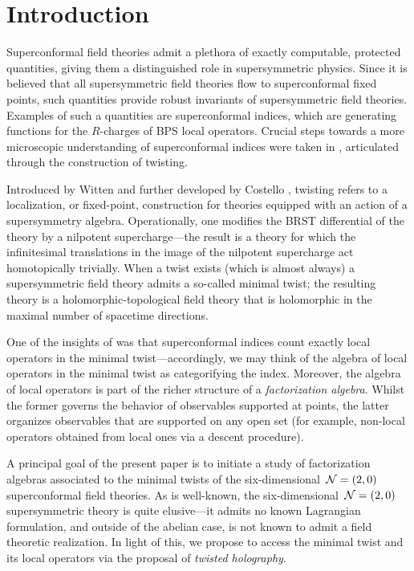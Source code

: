 %
%
%

\section{Introduction}
Superconformal field theories admit a plethora of exactly computable, protected quantities, giving them a distinguished role in supersymmetric physics. 
Since it is believed that all supersymmetric field theories flow to superconformal fixed points, such quantities provide robust invariants of supersymmetric field theories. 
Examples of such a quantities are superconformal indices, which are generating functions for the $R$-charges of BPS local operators. 
Crucial steps towards a more microscopic understanding of superconformal indices were taken in \cite{}, articulated through the construction of twisting.

Introduced by Witten \cite{WittenTwist} and further developed by Costello \cite{CostelloHol}, twisting refers to a localization, or fixed-point, construction for theories equipped with an action of a supersymmetry algebra. 
Operationally, one modifies the BRST differential of the theory by a nilpotent supercharge---the result is a theory for which the infinitesimal translations in the image of the nilpotent supercharge act homotopically trivially. 
When a twist exists (which is almost always) a supersymmetric field theory admits a so-called minimal twist; the resulting theory is a holomorphic-topological field theory that is holomorphic in the maximal number of spacetime directions.

One of the insights of \cite{} was that superconformal indices count exactly local operators in the minimal twist---accordingly, we may think of the algebra of local operators in the minimal twist as categorifying the index. 
Moreover, the algebra of local operators is part of the richer structure of a \textit{factorization algebra}. 
Whilst the former governs the behavior of observables supported at points, the latter organizes observables that are supported on any open set (for example, non-local operators obtained from local ones via a descent procedure). 

A principal goal of the present paper is to initiate a study of factorization algebras associated to the minimal twists of the six-dimensional~$\mathcal N=(2,0)$ superconformal field theories.
As is well-known, the six-dimensional~$\mathcal N=(2,0)$ supersymmetric theory is quite elusive---it admits no known Lagrangian formulation, and outside of the abelian case, is not known to admit a field theoretic realization. 
In light of this, we propose to access the minimal twist and its local operators via the proposal of \textit{twisted holography}.


